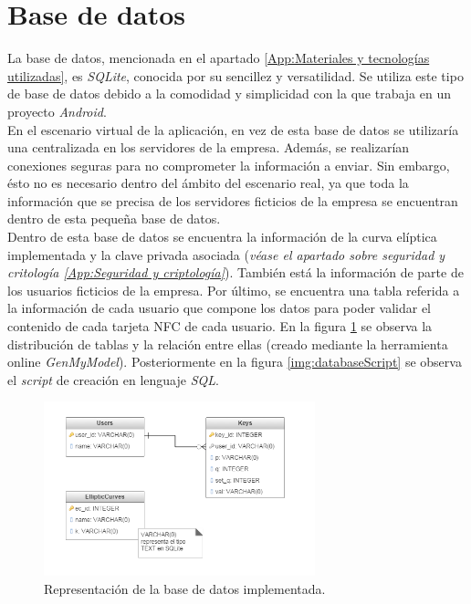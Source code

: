 \documentclass[../PFC.tex]{subfiles}
\begin{document}
\section{Base de datos}
\label{App:Base de datos}

La base de datos, mencionada en el apartado \ref{App:Materiales y tecnologías utilizadas}, es \textit{SQLite}, conocida por su sencillez y versatilidad. Se utiliza este tipo de base de datos debido a la comodidad y simplicidad con la que trabaja en un proyecto \textit{Android}.
\*
\vspace{0.5515cm}
\\
En el escenario virtual de la aplicación, en vez de esta base de datos se utilizaría una centralizada en los servidores de la empresa. Además, se realizarían conexiones seguras para no comprometer la información a enviar. Sin embargo, ésto no es necesario dentro del ámbito del escenario real, ya que toda la información que se precisa de los servidores ficticios de la empresa se encuentran dentro de esta pequeña base de datos.
\*
\vspace{0.5515cm}
\\
Dentro de esta base de datos se encuentra la información de la curva elíptica implementada y la clave privada asociada (\textit{véase el apartado sobre seguridad y critología \ref{App:Seguridad y criptología}}). También está la información de parte de los usuarios ficticios de la empresa. Por último, se encuentra una tabla referida a la información de cada usuario que compone los datos para poder validar el contenido de cada tarjeta NFC de cada usuario. En la figura \ref{img:database} se observa la distribución de tablas y la relación entre ellas (creado mediante la herramienta online \textit{GenMyModel}\cite{diagramaDBOnline}). Posteriormente en la figura \ref{img:databaseScript} se observa el \textit{script} de creación en lenguaje \textit{SQL}.

\begin{figure}[H]
  \centering
  \includegraphics[width=0.7\textwidth]{./img/database}
  \caption{Representación de la base de datos implementada.}
  \label{img:database}
\end{figure}
\end{document}
